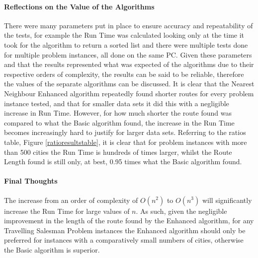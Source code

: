\documentclass[conference,backref=page]{acmsiggraph}
\begin{document}
\paragraph{Reflections on the Value of the Algorithms}
There were many parameters put in place to ensure accuracy and repeatability of the tests, for example the Run Time was calculated looking only at the time it took for the algorithm to return a sorted list and there were multiple tests done for multiple problem instances, all done on the same PC. Given these parameters and that the results represented what was expected of the algorithms due to their respective orders of complexity, the results can be said to be reliable, therefore the values of the separate algorithms can be discussed. It is clear that the Nearest Neighbour Enhanced algorithm repeatedly found shorter routes for every problem instance tested, and that for smaller data sets it did this with a negligible increase in Run Time. However, for how much shorter the route found was compared to what the Basic algorithm found, the increase in the Run Time becomes increasingly hard to justify for larger data sets. Referring to the ratios table, Figure \ref{ratioresultstable}, it is clear that for problem instances with more than 500 cities the Run Time is hundreds of times larger, whilst the Route Length found is still only, at best, 0.95 times what the Basic algorithm found.
\paragraph{Final Thoughts}
The increase from an order of complexity of $O(n^2)$ to $O(n^3)$ will significantly increase the Run Time for large values of $n$. As such, given the negligible improvement in the length of the route found by the Enhanced algorithm, for any Travelling Salesman Problem instances the Enhanced algorithm should only be preferred for instances with a comparatively small numbers of cities, otherwise the Basic algorithm is superior.
\end{document}
